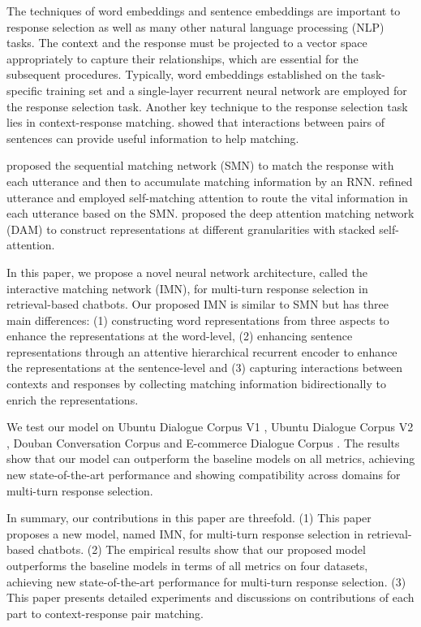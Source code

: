 \documentclass[sigconf]{acmart}
\begin{document}
  The techniques of word embeddings and sentence embeddings are important to response selection as well as many other natural language processing (NLP) tasks. The context and the response must be projected to a vector space appropriately to capture their relationships, which are essential for the subsequent procedures. Typically, word embeddings established on the task-specific training set and a single-layer recurrent neural network are employed for the response selection task. Another key technique to the response selection task lies in context-response matching. \citet{DBLP:conf/acl/ChenZLWJI17} showed that interactions between pairs of sentences can provide useful information to help matching.

  \citet{DBLP:conf/acl/WuWXZL17} proposed the sequential matching network (SMN) to match the response with each utterance and then to accumulate matching information by an RNN. \citet{DBLP:conf/coling/ZhangLZZL18} refined utterance and employed self-matching attention to route the vital information in each utterance based on the SMN. \citet{DBLP:conf/acl/WuLCZDYZL18} proposed the deep attention matching network (DAM) to construct representations at different granularities with stacked self-attention.

  In this paper, we propose a novel neural network architecture, called the interactive matching network (IMN), for multi-turn response selection in retrieval-based chatbots. Our proposed IMN is similar to SMN but has three main differences: (1) constructing word representations from three aspects to enhance the representations at the word-level, (2) enhancing sentence representations through  an attentive hierarchical recurrent encoder to enhance the representations at the sentence-level and (3) capturing interactions between contexts and responses by collecting matching information bidirectionally to enrich the representations.

  We test our model on Ubuntu Dialogue Corpus V1 \cite{DBLP:conf/sigdial/LowePSP15}, Ubuntu Dialogue Corpus V2 \cite{DBLP:journals/dad/LowePSCLP17}, Douban Conversation Corpus \cite{DBLP:conf/acl/WuWXZL17} and E-commerce Dialogue Corpus \cite{DBLP:conf/coling/ZhangLZZL18}. The results show that our model can outperform the baseline models on all metrics, achieving new state-of-the-art performance and showing compatibility across domains for multi-turn response selection.

  In summary, our contributions in this paper are threefold. (1) This paper proposes a new model, named IMN, for multi-turn response selection in retrieval-based chatbots. (2) The empirical results show that our proposed model outperforms the baseline models in terms of all metrics on four datasets, achieving new state-of-the-art performance for multi-turn response selection. (3) This paper presents detailed experiments and discussions on contributions of each part to context-response pair matching.
\end{document}
